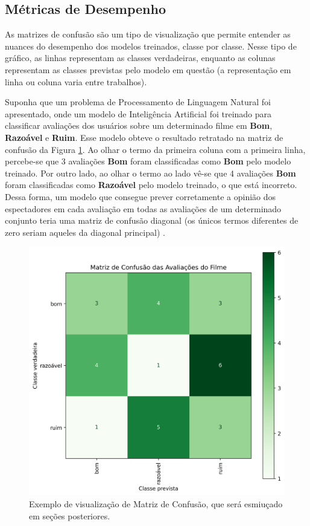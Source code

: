 \subsection{Métricas de Desempenho}
\label{métricas_de_desempenho}
As matrizes de confusão são um tipo de visualização que permite entender as nuances do desempenho dos modelos treinados, classe por classe. Nesse tipo de gráfico, as linhas representam as classes verdadeiras, enquanto as colunas representam as classes previstas pelo modelo em questão (a representação em linha ou coluna varia entre trabalhos). 

Suponha que um problema de Processamento de Linguagem Natural foi apresentado, onde um modelo de Inteligência Artificial foi treinado para classificar avaliações dos usuários sobre um determinado filme em \textbf{Bom}, \textbf{Razoável} e \textbf{Ruim}. Esse modelo obteve o resultado retratado na matriz de confusão da Figura \ref{fig:cm_example}. Ao olhar o termo da primeira coluna com a primeira linha, percebe-se que 3 avaliações \textbf{Bom} foram classificadas como \textbf{Bom} pelo modelo treinado. Por outro lado, ao olhar o termo ao lado vê-se que 4 avaliações \textbf{Bom} foram classificadas como \textbf{Razoável} pelo modelo treinado, o que está incorreto.   Dessa forma, um modelo que consegue prever corretamente a opinião dos espectadores em cada avaliação em todas as avaliações de um determinado conjunto teria uma matriz de confusão diagonal (os únicos termos diferentes de zero seriam aqueles da diagonal principal) \cite{metrics_survey}.

\begin{figure}[htb]
        \centering
        \includegraphics[width=14cm]{figuras/exemplo_filmes.png}
        \caption{Exemplo de visualização de Matriz de Confusão, que será esmiuçado em seções posteriores.}
        \label{fig:cm_example}
\end{figure}

